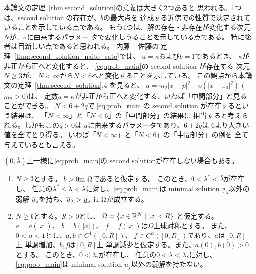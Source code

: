 本論文の定理~\ref{thm:second_solution}の意義は大きく2つあると
思われる。1つは、second solution の存在が、$b$の最大点を
達成する近傍での性質で決定されていることを示している点である。
もう1つは、解の存在・非存在が変化する次元$N$が、$a$に由来するパラメー
タで変化しうることを示している点である。
特に後者は目新しい点であると思われる。
内藤 -- 佐藤の
定理~\ref{thm:second_solution_naito_sato}では、
$a = \kappa$および$b = 1$であるとき、
$\kappa$が非正から正へと変化すると、
\ref{eq:prob_main}の second solution が存在する
次元$N \geq 3$が、
$N < \infty$から$N < 6$へと変化することを示している。
この観点から本論文の定理~\ref{thm:second_solution}.4 を見ると、
$a = m_2 \lvert x - p \rvert^{q} + o(\lvert x-x_0
\rvert^{q})$ ($m_2 > 0$)は、
定数$a = \kappa$が非正から正へと変化する、いわば「中間部分」と見ることができる。
$N < 6 + 2q$で
\ref{eq:prob_main}の second solution が存在するという結果は、
「$N < \infty$」と「$N < 6$」の「中間部分」の結果に
相当すると考えられる。しかもこの$q > 0$は
$a$に由来するパラメータであり、$6 + 2q$は
$6$より大きい値を全てとり得る。
いわば「$N < \infty$」と「$N < 6$」の「中間部分」の例を
全て与えているとも言える。

$(0, \bar{\lambda})$上一様に\ref{eq:prob_main}の
second solutionが存在しない場合もある。

\begin{thm} \label{thm:second_solution_nonex}
 \begin{enumerate}[1.]  \sage
  \item $N \geq 3$とする。
        $b > 0 \text{in}~ \Omega$であると仮定する。
        このとき、$0 < \lambda^* < \bar{\lambda}$が存在し、
        任意の$\lambda^* \leq
        \lambda < \bar{\lambda}$に対し、\ref{eq:prob_main}は
        minimal solution $\underline{u}_\lambda$以外の弱解
        $\bar{u}_\lambda$を持ち、$\overline{u}_\lambda >
        \underline{u}_\lambda ~\text{in}~ \Omega$が成立する。
  \item $N \geq 6$とする。$R > 0$とし、
        $\Omega = \{ x \in \mathbb{R}^N \mid \lvert x \rvert < R\}$
        と仮定する。
        $a = a(\lvert x \rvert)$、
        $b = b(\lvert x \rvert)$、
        $f = f(\lvert x \rvert)$は$\Omega$上球対称とする。
        また、$0 < \alpha < 1$とし、$a , b \in C^1([0, R])$、
        $f \in C^\alpha([0, R])$であり、$a$は$[0, R]$上
        単調増加、$b, f$は$[0, R]$上
        単調減少と仮定する。また、$a(0), b(0) > 0$とする。
        このとき、$0 < \lambda_*$が存在し、
        任意の$0 < \lambda < \lambda_*$に対し、
        \ref{eq:prob_main}は
        minimal solution $\underline{u}_\lambda$以外の弱解を持たない。
 \end{enumerate}
\end{thm}

